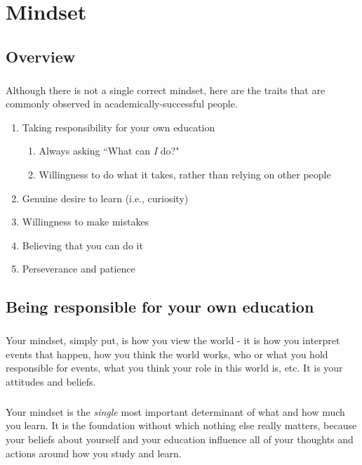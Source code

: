 \chapter{Mindset}
	\section{Overview}
	\paragraph{}
	Although there is not a single correct mindset, here are the traits that are commonly
	observed in academically-successful people. 
	
	\begin{enumerate}
		\item Taking responsibility for your own education
			\begin{enumerate}
			\item Always asking ``What can \emph{I} do?"
			\item Willingness to do what it takes, rather than relying on other people
			\end{enumerate}
		\item Genuine desire to learn (i.e., curiosity)
		\item Willingness to make mistakes
		\item Believing that you can do it 
		\item Perseverance and patience
	\end{enumerate}

	\section{Being responsible for your own education}
	\paragraph{}
	Your mindset, simply put, is how you view the world - it is how you interpret 
	events that happen, how you think the world works, who or what you hold responsible
	for events, what you think your role in this world is, etc. It is your attitudes and 
	beliefs. 
	
	\paragraph{}
	Your mindset is the \emph{single} most important determinant of what and how
	much you learn. It is the foundation without which nothing else really matters, because 
	your beliefs about yourself and your education influence all of your thoughts and actions around
	how you study and learn. 
	
